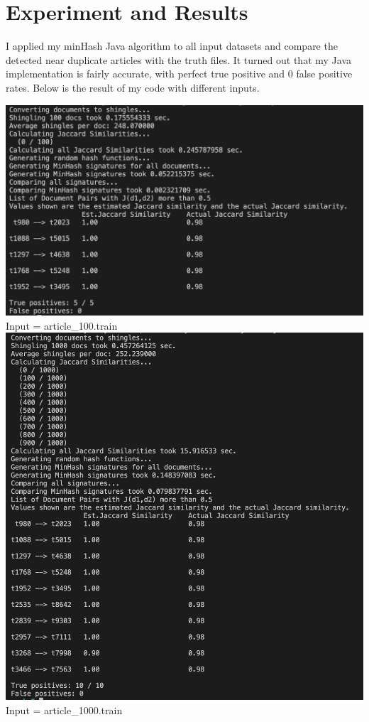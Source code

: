 \documentclass[9pt,twoside]{exam}
\begin{document}
\section*{Experiment and Results}

I applied my minHash Java algorithm to all input datasets and compare the detected near duplicate articles with the truth files. It turned out that my Java implementation is fairly accurate, with perfect true positive and 0 false positive rates. Below is the result of my code with different inputs. \\
\begin{center}
\includegraphics[scale=0.7]{100.png}\\
Input = article\_100.train\\

\includegraphics[scale=0.7]{1000.png}\\
Input = article\_1000.train\\


\end{center}
\end{document}
